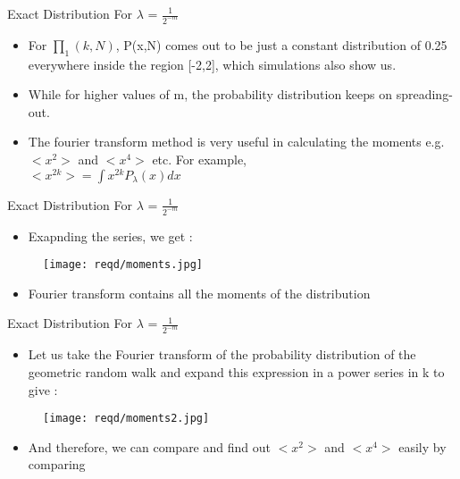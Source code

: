 \documentclass{beamer}
\begin{document}
\begin{frame}{Exact Distribution For $\lambda$ = $\frac{1}{2^{-m}}$}
	\begin{itemize}
	\setlength\itemsep{1em}
		\item{\large For $\prod_{1}(k,N)$, P(x,N) comes out to be just a constant distribution of 0.25 everywhere inside the region [-2,2], which simulations also show us.}
		\item{\large While for higher values of m, the probability distribution keeps on spreading-out.}
		\item{\large The fourier transform method is very useful in calculating the moments e.g. $<x^2>$ and $<x^4>$ etc. For example,\\
		\vspace{1em} \hspace{5em}
		$<x^{2k}>=\int x^{2k} P_{\lambda}(x) dx$}
	\end{itemize}
\end{frame}

\begin{frame}{Exact Distribution For $\lambda$ = $\frac{1}{2^{-m}}$}
	\begin{itemize}
		\item{\large Exapnding the series, we get :}
	\end{itemize}
	\begin{figure}
    		\centering
    		\texttt{[image: reqd/moments.jpg]}
	\end{figure}
	\begin{itemize}
		\item{\large Fourier transform contains all the moments of the
distribution}
	\end{itemize}
\end{frame}

\begin{frame}{Exact Distribution For $\lambda$ = $\frac{1}{2^{-m}}$}
	\begin{itemize}
		\item{\large Let us take the Fourier transform of the probability distribution of the geometric random walk and expand this expression in a power series in k to give :}
	\end{itemize}
	\begin{figure}
    		\centering
    		\texttt{[image: reqd/moments2.jpg]}
	\end{figure}
	\begin{itemize}
		\item{\large And therefore, we can compare and find out $<x^2>$ and $<x^4>$ easily by comparing}
	\end{itemize}
\end{frame}
\end{document}
